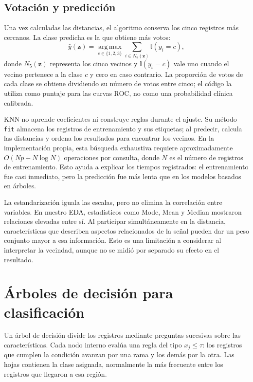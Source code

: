 \subsection{Votaci\'on y predicci\'on}
Una vez calculadas las distancias, el algoritmo conserva los cinco registros m\'as cercanos. La clase predicha es la que obtiene m\'as votos:
\begin{equation}
\hat y(\mathbf{z})=\operatorname*{arg\,max}_{c\in\{1,2,3\}}
\sum_{i\in N_5(\mathbf{z})}\mathbb{I}(y_i=c),
\end{equation}
donde $N_5(\mathbf{z})$ representa los cinco vecinos y $\mathbb{I}(y_i=c)$ vale uno cuando el vecino pertenece a la clase $c$ y cero en caso contrario. La proporci\'on de votos de cada clase se obtiene dividiendo su n\'umero de votos entre cinco; el c\'odigo la utiliza como puntaje para las curvas ROC, no como una probabilidad cl\'inica calibrada.

KNN no aprende coeficientes ni construye reglas durante el ajuste. Su m\'etodo \texttt{fit} almacena los registros de entrenamiento y sus etiquetas; al predecir, calcula las distancias y ordena los resultados para encontrar los vecinos. En la implementaci\'on propia, esta b\'usqueda exhaustiva requiere aproximadamente $O(Np+N\log N)$ operaciones por consulta, donde $N$ es el n\'umero de registros de entrenamiento. Esto ayuda a explicar los tiempos registrados: el entrenamiento fue casi inmediato, pero la predicci\'on fue m\'as lenta que en los modelos basados en \'arboles.

La estandarizaci\'on iguala las escalas, pero no elimina la correlaci\'on entre variables. En nuestro EDA, estad\'isticos como Mode, Mean y Median mostraron relaciones elevadas entre s\'i. Al participar simult\'aneamente en la distancia, caracter\'isticas que describen aspectos relacionados de la se\~nal pueden dar un peso conjunto mayor a esa informaci\'on. Esto es una limitaci\'on a considerar al interpretar la vecindad, aunque no se midi\'o por separado su efecto en el resultado.

\section{\'Arboles de decisi\'on para clasificaci\'on}
Un \'arbol de decisi\'on divide los registros mediante preguntas sucesivas sobre las caracter\'isticas. Cada nodo interno eval\'ua una regla del tipo $x_j\leq\tau$: los registros que cumplen la condici\'on avanzan por una rama y los dem\'as por la otra. Las hojas contienen la clase asignada, normalmente la m\'as frecuente entre los registros que llegaron a esa regi\'on.

